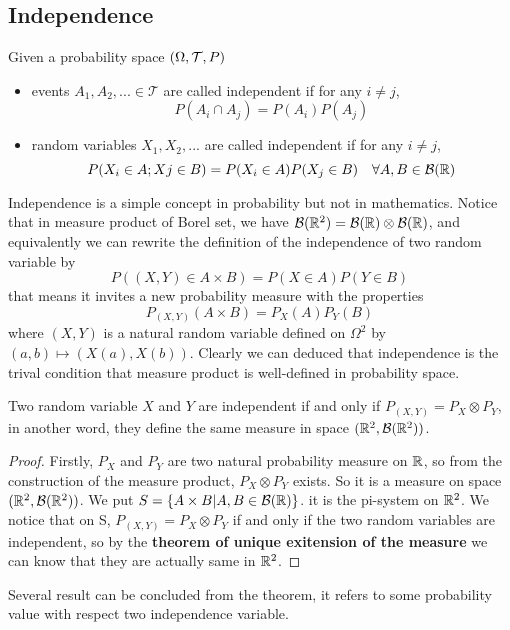 \documentclass[en,geye,blue,normal,12pt,bibend=bibtex]{elegantnote}
\begin{document}
\subsection{Independence}
\begin{definition}
    Given a probability space \((\Omega, \mathcal{T}, P)\)
    \begin{itemize}
        \item  events \(A_1,A_2,... \in \mathcal{T}\) are called independent if for any \(i \neq j\), \[P(A_i \cap A_j) = P(A_i)P(A_j)\]
        \item random variables \(X_1,X_2,...\) are called independent if for any \(i \neq j\), \[P(X_i\in A;Xj \in B) = P(X_i \in A)P(X_j \in B) \quad \forall A,B \in \mathcal{B}(\mathbb{R})\]
    \end{itemize}
\end{definition}

\begin{remark}
    Independence is a simple concept in probability but not in mathematics. Notice that in measure product of Borel set, we have \(\mathcal{B}(\mathbb{R}^2) = \mathcal{B}(\mathbb{R}) \otimes \mathcal{B}(\mathbb{R})\), and equivalently we can rewrite the definition of the independence of two random variable by 
    \[P((X,Y) \in A \times B) = P(X \in A)P(Y \in B)\]
    that means it invites a new probability measure with the properties
    \[P_{(X,Y)}(A \times B) = P_X(A)P_Y(B)\]
    where \((X,Y)\) is a natural random variable defined on \(\Omega^2\) by \((a,b) \mapsto (X(a),X(b))\). Clearly we can deduced that independence is the trival condition that measure product is well-defined in probability space.
\end{remark}

\begin{theorem}
    Two random variable \(X\) and \(Y\) are independent if and only if \(P_{(X,Y)} = P_X \otimes P_Y\), in another word, they define the same measure in space \((\mathbb{R}^2, \mathcal{B}(\mathbb{R}^2))\).

    \begin{proof}
        Firstly, \(P_X\) and \(P_Y\) are two natural probability measure on \(\mathbb{R}\), so from the construction of the measure product, \(P_X \otimes P_Y\) exists. So it is a measure on space \((\mathbb{R}^2,\mathcal{B}(\mathbb{R}^2))\). We put \(S = \{A \times B| A,B \in \mathcal{B}(\mathbb{R})\}\). it is the pi-system on \(\mathbb{R}^2\). We notice that on S,  \(P_{(X,Y)}=P_X \otimes P_Y \) if and only if the two random variables are independent, so by the \textbf{theorem of unique exitension of the measure} we can know that they are actually same in \(\mathbb{R}^2\).
    \end{proof}
\end{theorem}
Several result can be concluded from the theorem, it refers to some probability value with respect two independence variable.
\end{document}
